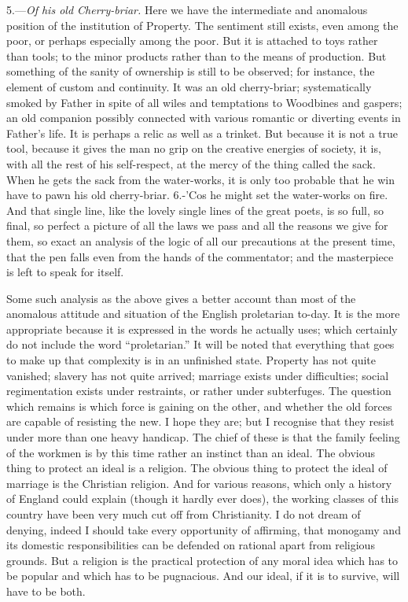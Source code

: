 \documentclass{book}
\begin{document}
5.—\emph{Of his old Cherry-briar.} Here we have the intermediate and anomalous position of the institution of Property. The sentiment still exists, even among the poor, or perhaps especially among the poor. But it is attached to toys rather than tools; to the minor products rather than to the means of production. But something of the sanity of ownership is still to be observed; for instance, the element of custom and continuity. It was an old cherry-briar; systematically smoked by Father in spite of all wiles and temptations to Woodbines and gaspers; an old companion possibly connected with various romantic or diverting events in Father’s life. It is perhaps a relic as well as a trinket. But because it is not a true tool, because it gives the man no grip on the creative energies of society, it is, with all the rest of his self-respect, at the mercy of the thing called the sack. When he gets the sack from the water-works, it is only too probable that he win have to pawn his old cherry-briar. 6.-’Cos he might set the water-works on fire. And that single line, like the lovely single lines of the great poets, is so full, so final, so perfect a picture of all the laws we pass and all the reasons we give for them, so exact an analysis of the logic of all our precautions at the present time, that the pen falls even from the hands of the commentator; and the masterpiece is left to speak for itself.

Some such analysis as the above gives a better account than most of the anomalous attitude and situation of the English proletarian to-day. It is the more appropriate because it is expressed in the words he actually uses; which certainly do not include the word “proletarian.” It will be noted that everything that goes to make up that complexity is in an unfinished state. Property has not quite vanished; slavery has not quite arrived; marriage exists under difficulties; social regimentation exists under restraints, or rather under subterfuges. The question which remains is which force is gaining on the other, and whether the old forces are capable of resisting the new. I hope they are; but I recognise that they resist under more than one heavy handicap. The chief of these is that the family feeling of the workmen is by this time rather an instinct than an ideal. The obvious thing to protect an ideal is a religion. The obvious thing to protect the ideal of marriage is the Christian religion. And for various reasons, which only a history of England could explain (though it hardly ever does), the working classes of this country have been very much cut off from Christianity. I do not dream of denying, indeed I should take every opportunity of affirming, that monogamy and its domestic responsibilities can be defended on rational apart from religious grounds. But a religion is the practical protection of any moral idea which has to be popular and which has to be pugnacious. And our ideal, if it is to survive, will have to be both.
\end{document}
